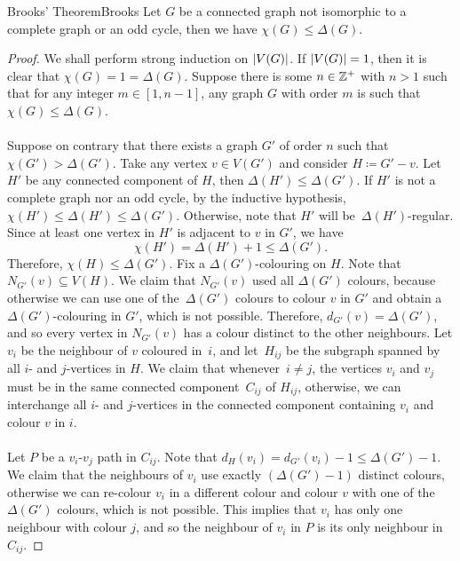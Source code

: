 \documentclass[math]{amznotes}
\theoremstyle{remark}
\begin{document}
\begin{thmbox}{Brooks' Theorem}{Brooks}
    Let $G$ be a connected graph not isomorphic to a complete graph or an odd cycle, then we have $\chi(G) \leq \Delta(G)$.
    \tcblower
    \begin{proof}
        We shall perform strong induction on ${\left\lvert {V(G)} \right\rvert}$. If ${\left\lvert {V(G)} \right\rvert} = 1$, then it is clear that $\chi(G) = 1 = \Delta(G)$. Suppose there is some $n \in \mathbb{Z}^+$ with $n > 1$ such that for any integer $m \in [1, n - 1]$, any graph $G$ with order $m$ is such that $\chi(G) \leq \Delta(G)$.
        \\\\
        Suppose on contrary that there exists a graph $G'$ of order $n$ such that $\chi(G') > \Delta(G')$. Take any vertex $v \in V(G')$ and consider $H \coloneqq G' - v$. Let $H'$ be any connected component of $H$, then $\Delta(H') \leq \Delta(G')$. If $H'$ is not a complete graph nor an odd cycle, by the inductive hypothesis, $\chi(H') \leq \Delta(H') \leq \Delta(G')$. Otherwise, note that $H'$ will be~$\Delta(H')$-regular. Since at least one vertex in $H'$ is adjacent to $v$ in $G'$, we have 
        \begin{equation*}
            \chi(H') = \Delta(H') + 1 \leq \Delta(G').
        \end{equation*}
        Therefore, $\chi(H) \leq \Delta(G')$. Fix a $\Delta(G')$-colouring on $H$. Note that $N_{G'}(v) \subseteq V(H)$. We claim that $N_{G'}(v)$ used all $\Delta(G')$ colours, because otherwise we can use one of the~$\Delta(G')$ colours to colour $v$ in $G'$ and obtain a $\Delta(G')$-colouring in $G'$, which is not possible. Therefore, $d_{G'}(v) = \Delta(G')$, and so every vertex in $N_{G'}(v)$ has a colour distinct to the other neighbours. Let $v_i$ be the neighbour of $v$ coloured in~$i$, and let~$H_{ij}$ be the subgraph spanned by all $i$- and $j$-vertices in $H$. We claim that whenever~$i \neq j$, the vertices $v_i$ and $v_j$ must be in the same connected component~$C_{ij}$ of $H_{ij}$, otherwise, we can interchange all $i$- and $j$-vertices in the connected component containing $v_i$ and colour $v$ in $i$.
        \\\\
        Let $P$ be a $v_i$-$v_j$ path in $C_{ij}$. Note that $d_H(v_i) = d_{G'}(v_i) - 1 \leq \Delta(G') - 1$. We claim that the neighbours of $v_i$ use exactly $(\Delta(G') - 1)$ distinct colours, otherwise we can re-colour $v_i$ in a different colour and colour $v$ with one of the $\Delta(G')$ colours, which is not possible. This implies that $v_i$ has only one neighbour with colour $j$, and so the neighbour of $v_i$ in $P$ is its only neighbour in $C_{ij}$. 

\end{proof}
\end{thmbox}
\end{document}
